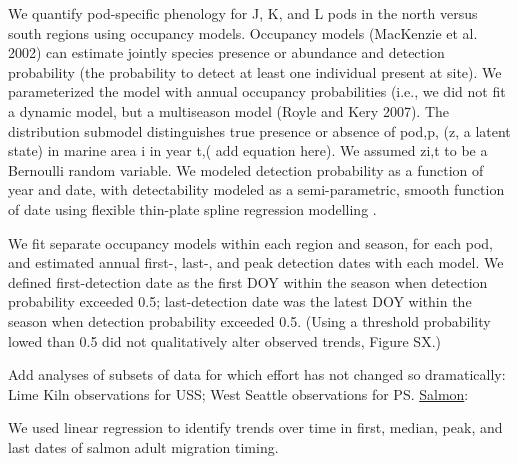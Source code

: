 \documentclass{article}
\begin{document}
\par We quantify pod-specific phenology for J, K, and L pods in the north versus south regions using occupancy models. Occupancy models (MacKenzie et al. 2002) can estimate jointly species presence or abundance and detection probability (the probability to detect at least one individual present at site). We parameterized the model with annual occupancy probabilities (i.e., we did not fit a dynamic model, but a multiseason model (Royle and Kery 2007). The distribution submodel distinguishes true presence or absence of pod,p, (z, a latent state) in marine area i in year t,( add equation here). We assumed zi,t to be a Bernoulli random variable. We modeled detection probability as a function of year and date, with detectability modeled as a semi-parametric, smooth function of date using flexible thin-plate spline regression modelling \citep{strebel2014}. 
\par  We fit separate occupancy models within each region and season, for each pod, and estimated annual first-, last-, and peak detection dates with each model. We defined first-detection date as the first DOY within the season when detection probability exceeded 0.5; last-detection date was the latest DOY within the season when detection probability exceeded 0.5. (Using a threshold probability lowed than 0.5 did not qualitatively alter observed trends, Figure SX.)
\par Add analyses of subsets of data for which effort has not changed so dramatically: Lime Kiln observations for USS; West Seattle observations for PS.
\underline{Salmon}:
\par We used linear regression to identify trends over time in first, median, peak, and last dates of salmon adult migration timing. 
\end{document}
